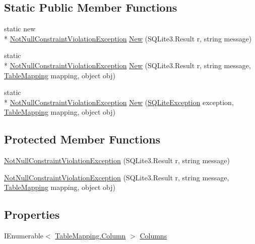 \subsection*{Static Public Member Functions}
\begin{DoxyCompactItemize}
\item 
static new \\*
\hyperlink{class_s_q_lite_1_1_not_null_constraint_violation_exception}{Not\+Null\+Constraint\+Violation\+Exception} \hyperlink{class_s_q_lite_1_1_not_null_constraint_violation_exception_a7989030e3242311aaca6b3d184184396}{New} (S\+Q\+Lite3.\+Result r, string message)
\item 
static \\*
\hyperlink{class_s_q_lite_1_1_not_null_constraint_violation_exception}{Not\+Null\+Constraint\+Violation\+Exception} \hyperlink{class_s_q_lite_1_1_not_null_constraint_violation_exception_ac25b33dde04a9b12bd6984038e4b2972}{New} (S\+Q\+Lite3.\+Result r, string message, \hyperlink{class_s_q_lite_1_1_table_mapping}{Table\+Mapping} mapping, object obj)
\item 
static \\*
\hyperlink{class_s_q_lite_1_1_not_null_constraint_violation_exception}{Not\+Null\+Constraint\+Violation\+Exception} \hyperlink{class_s_q_lite_1_1_not_null_constraint_violation_exception_a25c290bafcea136ebd06b2959bf20c3c}{New} (\hyperlink{class_s_q_lite_1_1_s_q_lite_exception}{S\+Q\+Lite\+Exception} exception, \hyperlink{class_s_q_lite_1_1_table_mapping}{Table\+Mapping} mapping, object obj)
\end{DoxyCompactItemize}
\subsection*{Protected Member Functions}
\begin{DoxyCompactItemize}
\item 
\hyperlink{class_s_q_lite_1_1_not_null_constraint_violation_exception_a6c1cdcfe9c9289aefb428bc42861a376}{Not\+Null\+Constraint\+Violation\+Exception} (S\+Q\+Lite3.\+Result r, string message)
\item 
\hyperlink{class_s_q_lite_1_1_not_null_constraint_violation_exception_a1323d85e646b1eb71943d03619291677}{Not\+Null\+Constraint\+Violation\+Exception} (S\+Q\+Lite3.\+Result r, string message, \hyperlink{class_s_q_lite_1_1_table_mapping}{Table\+Mapping} mapping, object obj)
\end{DoxyCompactItemize}
\subsection*{Properties}
\begin{DoxyCompactItemize}
\item 
I\+Enumerable$<$ \hyperlink{class_s_q_lite_1_1_table_mapping_1_1_column}{Table\+Mapping.\+Column} $>$ \hyperlink{class_s_q_lite_1_1_not_null_constraint_violation_exception_a21258090a43872e564b7e7c9faacc920}{Columns}
\end{DoxyCompactItemize}


